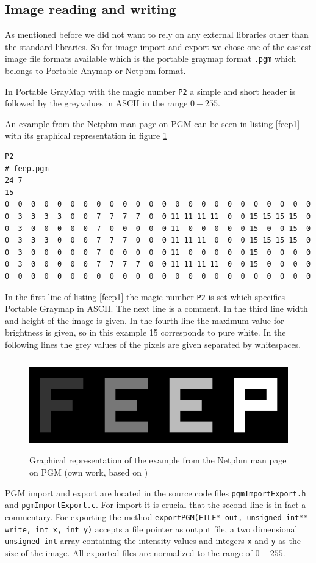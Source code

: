 \subsection{Image reading and writing}
\par As mentioned before we did not want to rely on any external libraries other than the standard libraries. So for image import and export we chose one of the easiest image file formats available which is the portable graymap format \verb!.pgm! which belongs to Portable Anymap or Netpbm format.
\par In Portable GrayMap with the magic number \verb!P2! a simple and short header is followed by the greyvalues in ASCII in the range \(0-255\).
\par An example from the Netpbm man page on PGM can be seen in listing \ref{feep1} with its graphical representation in figure \ref{feep2}
\begin{lstlisting}[caption={PGM example from the Netpbm man page on PGM\cite{pgmNetPBM}},label=feep1,captionpos=b]
P2
# feep.pgm
24 7
15
0  0  0  0  0  0  0  0  0  0  0  0  0  0  0  0  0  0  0  0  0  0  0  0
0  3  3  3  3  0  0  7  7  7  7  0  0 11 11 11 11  0  0 15 15 15 15  0
0  3  0  0  0  0  0  7  0  0  0  0  0 11  0  0  0  0  0 15  0  0 15  0
0  3  3  3  0  0  0  7  7  7  0  0  0 11 11 11  0  0  0 15 15 15 15  0
0  3  0  0  0  0  0  7  0  0  0  0  0 11  0  0  0  0  0 15  0  0  0  0
0  3  0  0  0  0  0  7  7  7  7  0  0 11 11 11 11  0  0 15  0  0  0  0
0  0  0  0  0  0  0  0  0  0  0  0  0  0  0  0  0  0  0  0  0  0  0  0
\end{lstlisting}
\par In the first line of listing \ref{feep1} the magic number \verb!P2! is set which specifies Portable Graymap in ASCII. The next line is a comment. In the third line width and height of the image is given. In the fourth line the maximum value for brightness is given, so in this example 15 corresponds to pure white. In the following lines the grey values of the pixels are given separated by whitespaces.
\begin{figure}[h!]
	\centering
	\includegraphics[height=4cm]{images/feep.png}
	\caption{Graphical representation of the example from the Netpbm man page on PGM (own work, based on \cite{pgmNetPBM})}
	\label{feep2}
\end{figure}
\par PGM import and export are located in the source code files \verb!pgmImportExport.h! and \verb!pgmImportExport.c!. For import it is crucial that the second line is in fact a commentary. For exporting the method \verb!exportPGM(FILE* out, unsigned int** write, int x, int y)! accepts a file pointer as output file, a two dimensional \verb!unsigned int! array containing the intensity values and integers \verb!x! and \verb!y! as the size of the image. All exported files are normalized to the range of \(0-255\).
